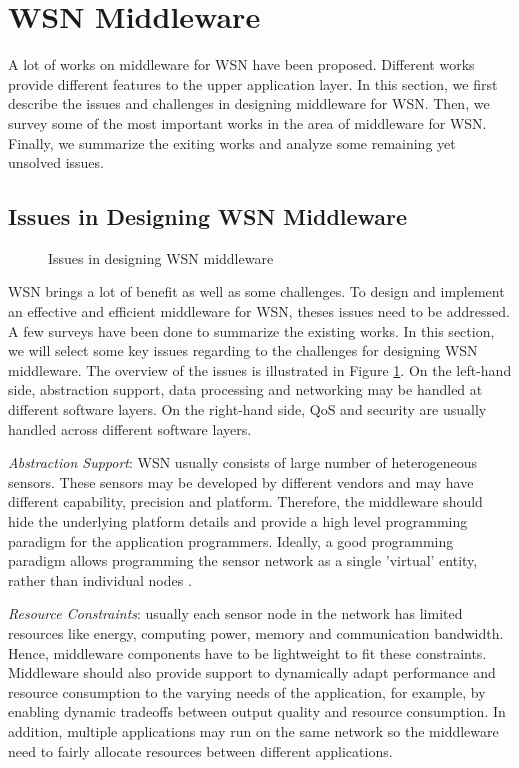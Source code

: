 \section{WSN Middleware}
\label{subsec:wsn-middleware}
A lot of works on middleware for WSN have been proposed. Different works provide different features to the upper application layer. In this section, we first describe the issues and challenges in designing middleware for WSN. Then, we survey some of the most important works in the area of middleware for WSN. Finally, we summarize the exiting works and analyze some remaining yet unsolved issues.

\subsection{Issues in Designing WSN Middleware}
\label{sec:middleware-issues}
\begin{figure}
\centering
{}
\caption{Issues in designing WSN middleware}
\label{fig:wsn-middleware-issues}
\end{figure}

WSN brings a lot of benefit as well as some challenges. To design and implement an effective and efficient middleware for WSN, theses issues need to be addressed. A few surveys \cite{programmingparadigms, middlewaresurvey1, middlewaresurvey2, middlewarechallenge} have been done to summarize the existing works. In this section, we will select some key issues regarding to the challenges for designing WSN middleware. The overview of the issues is illustrated in Figure \ref{fig:wsn-middleware-issues}. On the left-hand side, abstraction support, data processing and networking may be handled at different software layers. On the right-hand side, QoS and security are usually handled across different software layers.

\emph{Abstraction Support}: WSN usually consists of large number of heterogeneous sensors. These sensors may be developed by different vendors and may have different capability, precision and platform. Therefore, the middleware should hide the underlying platform details and provide a high level programming paradigm for the application programmers. Ideally, a good programming paradigm allows programming the sensor network as a single 'virtual' entity, rather than individual nodes \cite{programmingparadigms}.

\emph{Resource Constraints}: usually each sensor node in the network has limited resources like energy, computing power, memory and communication bandwidth. Hence, middleware components have to be lightweight to fit these constraints. Middleware should also provide support to dynamically adapt performance and resource consumption to the varying needs of the application, for example, by enabling dynamic tradeoffs between output quality and resource consumption. In addition, multiple applications may run on the same network so the middleware need to fairly allocate resources between different applications.

